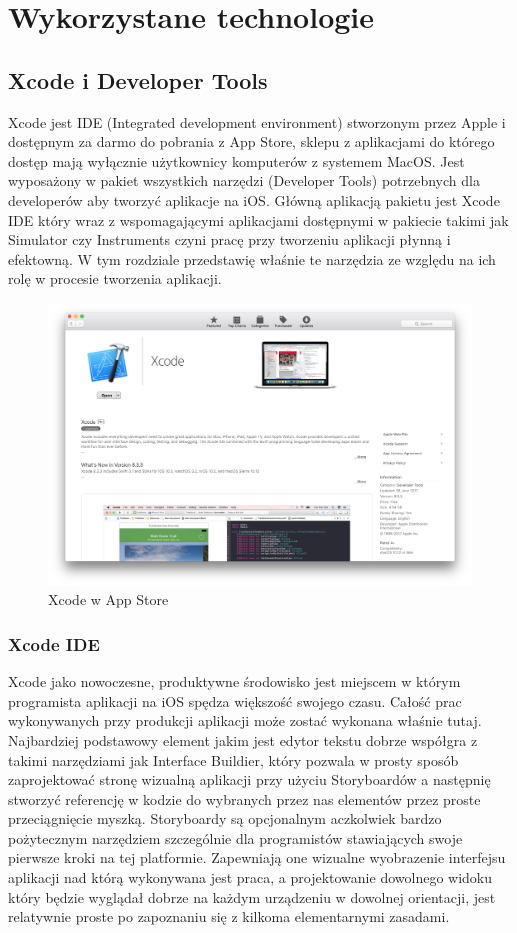 \chapter{Wykorzystane technologie}

\section{Xcode i Developer Tools}
Xcode jest IDE (Integrated development environment) stworzonym przez Apple i dostępnym za darmo do pobrania z App Store, sklepu
z aplikacjami do którego dostęp mają wyłącznie użytkownicy komputerów z systemem MacOS. Jest wyposażony w pakiet wszystkich narzędzi
(Developer Tools) potrzebnych dla developerów aby tworzyć aplikacje na iOS. Główną aplikacją pakietu jest Xcode IDE który wraz z
wspomagającymi aplikacjami dostępnymi w pakiecie takimi jak Simulator czy Instruments czyni pracę przy tworzeniu aplikacji płynną
i efektowną. W tym rozdziale przedstawię właśnie te narzędzia ze względu na ich rolę w procesie tworzenia aplikacji.

\begin{figure}[ht!]
  \centering
  \includegraphics[width=120mm]{images/chapter-2-image-1-appstore.png}
  \caption{Xcode w App Store}
  \label{chapter-2-image-1-appstore}
\end{figure}

\subsection{Xcode IDE}
Xcode jako nowoczesne, produktywne środowisko jest miejscem w którym programista aplikacji na iOS spędza większość swojego
czasu. Całość prac wykonywanych przy produkcji aplikacji może zostać wykonana właśnie tutaj. Najbardziej podstawowy element jakim
jest edytor tekstu dobrze współgra z takimi narzędziami jak Interface Buildier, który pozwala w prosty sposób zaprojektować stronę
wizualną aplikacji przy użyciu Storyboardów a następnię stworzyć referencję w kodzie do wybranych przez nas elementów przez proste
przeciągnięcie myszką. Storyboardy są opcjonalnym aczkolwiek bardzo pożytecznym narzędziem szczególnie dla programistów stawiających
swoje pierwsze kroki na tej platformie. Zapewniają one wizualne wyobrazenie interfejsu aplikacji nad którą wykonywana jest praca,
a projektowanie dowolnego widoku który będzie wyglądał dobrze na każdym urządzeniu w dowolnej orientacji, jest relatywnie proste po
zapoznaniu się z kilkoma elementarnymi zasadami.

